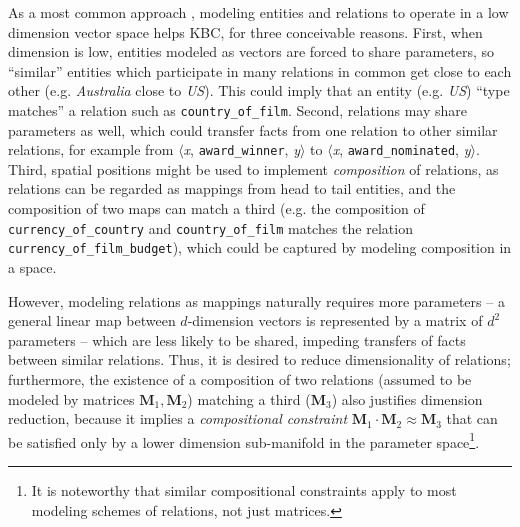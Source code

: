 \documentclass[11pt,a4paper]{article}
\newcommand{\mat}[1]{\bm{#1}}
\begin{document}

As a most common approach \citep{DBLP:journals/tkde/WangMWG17}, modeling entities and relations to operate in a low dimension 
vector space helps KBC, for three conceivable reasons. First, when dimension is low, entities modeled 
as vectors are forced to share parameters, so ``similar'' entities which participate in 
many relations in common get close to each other (e.g. \textit{Australia} close to \textit{US}). This 
could imply that an entity (e.g. \textit{US}) ``type matches'' a relation such 
as \texttt{country\_of\_film}. Second, relations may share parameters as well, which could transfer 
facts from one relation to other similar relations, for example 
from $\langle$\textit{x}, \texttt{award\_winner}, \textit{y}$\rangle$ to 
$\langle$\textit{x}, \texttt{award\_nominated}, \textit{y}$\rangle$. Third, spatial positions might be 
used to implement \emph{composition} of relations, as relations can be regarded as mappings from head to 
tail entities, and the composition of two maps can match a third (e.g. the composition 
of \texttt{currency\_of\_country} and \texttt{country\_of\_film} 
matches the relation \texttt{currency\_of\_film\_budget}), which 
could be captured by modeling composition in a space. 

However, modeling relations as mappings naturally requires more parameters -- a general linear 
map between $d$-dimension vectors is represented by a matrix of $d^2$ parameters -- 
which are less likely to be shared, impeding transfers of facts between similar relations. 
Thus, it is desired to reduce dimensionality of relations; furthermore, 
the existence of a composition of two relations 
(assumed to be modeled by matrices $\mat{M}_1,\mat{M}_2$) matching a third ($\mat{M}_3$) also justifies 
dimension reduction, because it implies 
a \emph{compositional constraint} $\mat{M}_1\cdot \mat{M}_2\approx \mat{M}_3$ that can be 
satisfied only by a 
lower dimension sub-manifold in the parameter 
space\footnote{It is noteworthy that similar compositional constraints apply to 
most modeling schemes of relations, not just matrices.}. 
\end{document}
